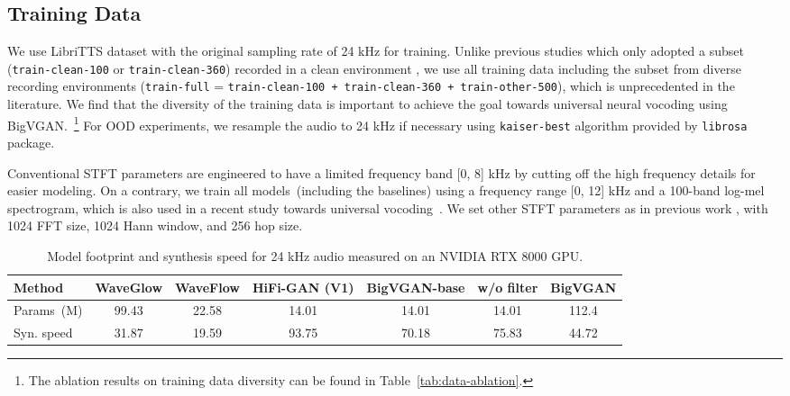 \documentclass{article} \usepackage{iclr2023_conference,times}
\theoremstyle{plain}
\theoremstyle{definition}
\theoremstyle{remark}
\begin{document}
\vspace{-.2cm}
\subsection{Training Data}
\vspace{-.1cm}
We use LibriTTS \citep{zen2019libritts} dataset with the original sampling rate of 24 kHz for training. Unlike previous studies which only adopted a subset (\texttt{train-clean-100} or \texttt{train-clean-360}) recorded in a clean environment \citep{jang2020universal, jang2021univnet, 
albadawy2021vocbench}, we use all training data including the subset from diverse recording environments (\texttt{train-full} = \texttt{train-clean-100 + train-clean-360 + train-other-500}), which is unprecedented in the literature. We find that the diversity of the training data is important to achieve the goal towards universal neural vocoding using BigVGAN.~\footnote{The ablation results on training data diversity can be found in Table~\ref{tab:data-ablation}.}
For OOD experiments, we resample the audio to 24 kHz if necessary using \texttt{kaiser-best} algorithm provided by \texttt{librosa} package.

Conventional STFT parameters are engineered to have a limited frequency band [0, 8] kHz by cutting off the high frequency details for easier modeling. On a contrary, we train all models~(including the baselines) using a frequency range [0, 12] kHz and a 100-band log-mel spectrogram, which is also used in a recent study towards universal vocoding~\citep{jang2021univnet}. We set other STFT parameters as in previous work \citep{kong2020hifi}, with 1024 FFT size, 1024 Hann window, and 256 hop size.


\begin{table}[t]
\vspace{-.2cm}
\caption{\footnotesize 
Model footprint and synthesis speed for 24 kHz audio measured on an NVIDIA RTX 8000 GPU. 
}
\label{tab:model_comparison}
\vspace{-0.1cm}
\begin{center}
\begin{small}
\begin{tabular}{l|c|c|c|cc|c}
\toprule
Method & WaveGlow & WaveFlow & HiFi-GAN (V1)  & BigVGAN-base &  w/o filter  & BigVGAN  \\
\midrule
Params~(M) & 99.43 & 22.58 & 14.01 & 14.01 & 14.01  & 112.4 \\
Syn. speed & 31.87 & 19.59  & 93.75 & 70.18  & 75.83 & 44.72 \\
\bottomrule
\end{tabular}
\end{small}
\end{center}
\vspace{-0.5cm}
\end{table}
\end{document}

